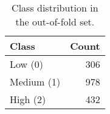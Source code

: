 \begin{table}
\caption{Class distribution in the out-of-fold set.}
\label{tab:class-dist}
\begin{tabular}{lr}
\toprule
Class & Count \\
\midrule
Low (0) & 306 \\
Medium (1) & 978 \\
High (2) & 432 \\
\bottomrule
\end{tabular}
\end{table}
